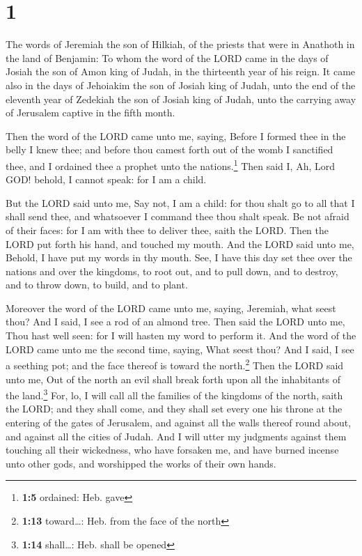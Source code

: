 \hypertarget{section}{%
\section{1}\label{section}}

 The words of Jeremiah the son of Hilkiah, of the priests
that were in Anathoth in the land of Benjamin:  To whom
the word of the LORD came in the days of Josiah the son of Amon king of
Judah, in the thirteenth year of his reign.  It came also
in the days of Jehoiakim the son of Josiah king of Judah, unto the end
of the eleventh year of Zedekiah the son of Josiah king of Judah, unto
the carrying away of Jerusalem captive in the fifth month.

 Then the word of the LORD came unto me, saying,
 Before I formed thee in the belly I knew thee; and before
thou camest forth out of the womb I sanctified thee, and I ordained thee
a prophet unto the nations.\footnote{\textbf{1:5} ordained: Heb. gave}
 Then said I, Ah, Lord GOD! behold, I cannot speak: for I
am a child.

 But the LORD said unto me, Say not, I am a child: for
thou shalt go to all that I shall send thee, and whatsoever I command
thee thou shalt speak.  Be not afraid of their faces: for
I am with thee to deliver thee, saith the LORD.  Then the
LORD put forth his hand, and touched my mouth. And the LORD said unto
me, Behold, I have put my words in thy mouth.  See, I
have this day set thee over the nations and over the kingdoms, to root
out, and to pull down, and to destroy, and to throw down, to build, and
to plant.

 Moreover the word of the LORD came unto me, saying,
Jeremiah, what seest thou? And I said, I see a rod of an almond tree.
 Then said the LORD unto me, Thou hast well seen: for I
will hasten my word to perform it.  And the word of the
LORD came unto me the second time, saying, What seest thou? And I said,
I see a seething pot; and the face thereof is toward the
north.\footnote{\textbf{1:13} toward\ldots: Heb. from the face of the
  north}  Then the LORD said unto me, Out of the north an
evil shall break forth upon all the inhabitants of the land.\footnote{\textbf{1:14}
  shall\ldots: Heb. shall be opened}  For, lo, I will
call all the families of the kingdoms of the north, saith the LORD; and
they shall come, and they shall set every one his throne at the entering
of the gates of Jerusalem, and against all the walls thereof round
about, and against all the cities of Judah.  And I will
utter my judgments against them touching all their wickedness, who have
forsaken me, and have burned incense unto other gods, and worshipped the
works of their own hands.

